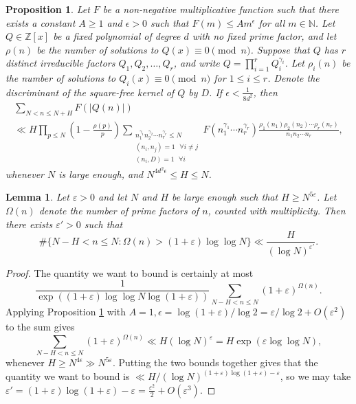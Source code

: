 \documentclass[10pt,a4paper]{amsart}
\newtheorem{prop}{Proposition}
\newtheorem{lemma}{Lemma}
\begin{document}
\begin{prop}\label{prop:nair-tenenbaum}
    Let $F$ be a non-negative multiplicative function such that there exists a constant $A\geq 1$ and $\epsilon >0$ such that $F(m)\leq Am^{\epsilon}$ for all $m\in\mathbb N$. Let $Q\in\mathbb Z[x]$ be a fixed polynomial of degree $d$ with no fixed prime factor, and let $\rho(n)$ be the number of solutions to $Q(x)\equiv 0\pmod n$. Suppose that $Q$ has $r$ distinct irreducible factors $Q_1, Q_2, \ldots, Q_r$, and write $Q = \prod_{i=1}^r Q_i^{\gamma_i}$. Let $\rho_i(n)$ be the number of solutions to $Q_i(x)\equiv 0\pmod n$ for $1\leq i\leq r$. Denote the discriminant of the square-free kernel of $Q$ by $D$. If $\epsilon<\frac{1}{8d^2}$, then 
    \begin{multline*}
        \sum_{N<n\leq N+H} F(\lvert Q(n)\rvert ) \\ \ll H\prod_{p\leq N}\left(1-\frac{\rho(p)}{p}\right) \sum_{\substack{n_1^{\gamma_1}n_2^{\gamma_2}\cdots n_r^{\gamma_r}\leq N \\ (n_i, n_j)=1 \text{ }\forall i\neq j \\ (n_i, D)=1 \text{ }\forall i}} F(n_1^{\gamma_1}\cdots n_r^{\gamma_r})\frac{\rho_1(n_1)\rho_2(n_2)\cdots \rho_r(n_r)}{n_1n_2\cdots n_r},
    \end{multline*}
    whenever $N$ is large enough, and $N^{4d^2\epsilon}\leq H\leq N$. 
\end{prop}

\begin{lemma}\label{lemma:tooManyPrimes}
    Let $\varepsilon>0$ and let $N$ and $H$ be large enough such that $H\geq N^{5\varepsilon}$. Let $\Omega(n)$ denote the number of prime factors of $n$, counted with multiplicity. Then there exists $\varepsilon'>0$ such that 
    \begin{equation*}
        \#\{N-H<n\leq N : \Omega(n)>(1+\varepsilon)\log\log N\}\ll \frac{H}{(\log N)^{\varepsilon'}}.
    \end{equation*}
\end{lemma}

\begin{proof}
The quantity we want to bound is certainly at most 
\begin{equation*}
    \frac{1}{\exp((1+\varepsilon)\log\log N\log(1+\varepsilon))}\sum_{N-H<n\leq N} (1+\varepsilon)^{\Omega(n)}.
\end{equation*}
Applying Proposition \ref{prop:nair-tenenbaum} with  $A=1, \epsilon = \log(1+\varepsilon)/\log 2=\varepsilon/\log 2 +O(\varepsilon^2)$ to the sum gives 
\begin{equation*}
    \sum_{N-H<n\leq N} (1+\varepsilon)^{\Omega(n)}\ll H(\log N)^{\varepsilon} = H\exp(\varepsilon\log\log N),
\end{equation*}
whenever $H\geq N^{4\epsilon}\gg N^{5\varepsilon}$. Putting the two bounds together gives that the quantity we want to bound is $\ll H/(\log N)^{(1+\varepsilon)\log(1+\varepsilon)-\varepsilon}$, so we may take $\varepsilon' = (1+\varepsilon)\log(1+\varepsilon)-\varepsilon = \frac{\varepsilon^2}{2} + O(\varepsilon^3)$. 
\end{proof}
\end{document}
